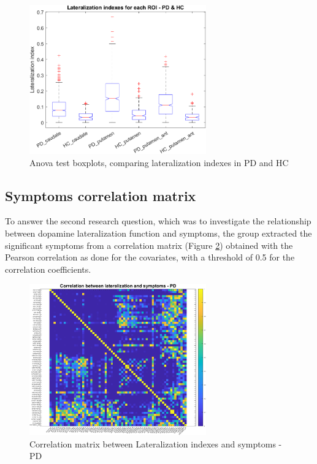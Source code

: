 \documentclass[]{article}
\begin{document}
\begin{figure}[h]
\centering
\includegraphics[width=3in]{../anova_plot_lat_hc_pd}
\caption{Anova test boxplots, comparing lateralization indexes in PD and HC}
\label{fig:anova_plot}
\end{figure} 

\begin{multicols}{2}

\subsection{Symptoms correlation matrix}

To answer the second research question, which was to investigate the relationship between dopamine lateralization function and symptoms, the group extracted the significant symptoms from a correlation matrix (Figure \ref{fig:corr_symp_pd}) obtained with the Pearson correlation as done for the covariates, with a threshold of 0.5 for the correlation coefficients. 

\end{multicols}

\begin{figure}[h]
	\centering
	\includegraphics[width=3in]{../corr_mat_symptoms_pd}
	\caption{Correlation matrix between Lateralization indexes and symptoms - PD}
	\label{fig:corr_symp_pd}
\end{figure} 
\end{document}

